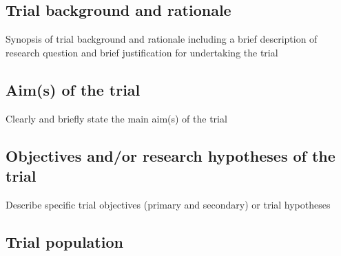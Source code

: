 \subsection{Trial background and rationale}

Synopsis of trial background and rationale including a brief
description of research question and brief justification for
undertaking the trial


\subsection{Aim(s) of the trial}

Clearly and briefly state the main aim(s) of the trial



\subsection{Objectives and/or research hypotheses of the trial}

Describe specific trial objectives (primary and secondary) or trial
hypotheses



\subsection{Trial population}

